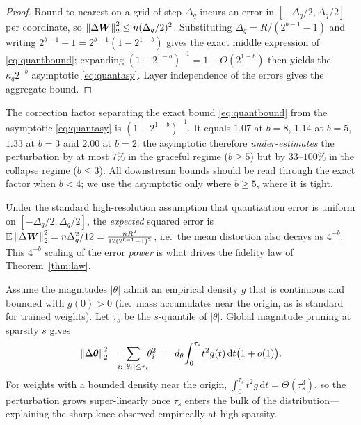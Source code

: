 \begin{proof}
Round-to-nearest on a grid of step $\Delta_q$ incurs an error in
$[-\Delta_q/2,\Delta_q/2]$ per coordinate, so $\left\lVert\Delta\bm{W}\right\rVert_2^2\le
n(\Delta_q/2)^2$. Substituting $\Delta_q=R/(2^{b-1}-1)$ and writing
$2^{b-1}-1=2^{b-1}(1-2^{1-b})$ gives the exact middle expression of
\eqref{eq:quantbound}; expanding $(1-2^{1-b})^{-1}=1+O(2^{1-b})$ then yields the
$\kappa_q 2^{-b}$ asymptotic \eqref{eq:quantasy}. Layer independence of the
errors gives the aggregate bound.
\end{proof}

\begin{remark}
\label{rem:asyacc}
The correction factor separating the exact bound \eqref{eq:quantbound} from the
asymptotic \eqref{eq:quantasy} is $(1-2^{1-b})^{-1}$. It equals $1.07$ at
$b=8$, $1.14$ at $b=5$, $1.33$ at $b=3$ and $2.00$ at $b=2$: the asymptotic
therefore \emph{under-estimates} the perturbation by at most $7\%$ in the
graceful regime ($b\ge5$) but by $33$--$100\%$ in the collapse regime
($b\le3$). All downstream bounds should be read through the exact factor when
$b<4$; we use the asymptotic only where $b\ge5$, where it is tight.
\end{remark}

\begin{remark}
Under the standard high-resolution assumption that quantization error is
uniform on $[-\Delta_q/2,\Delta_q/2]$, the \emph{expected} squared error is
$\mathbb{E}\left\lVert\Delta\bm{W}\right\rVert_2^2=n\Delta_q^2/12=\tfrac{n R^2}{12(2^{b-1}-1)^2}$, i.e.\ the
mean distortion also decays as $4^{-b}$. This $4^{-b}$ scaling of the error
\emph{power} is what drives the fidelity law of Theorem~\ref{thm:law}.
\end{remark}

\begin{lemma}
\label{lem:prune}
Assume the magnitudes $|\theta|$ admit an empirical density $g$ that is
continuous and bounded with $g(0)>0$ (i.e.\ mass accumulates near the origin, as
is standard for trained weights). Let $\tau_s$ be the $s$-quantile of $|\theta|$.
Global magnitude pruning at sparsity $s$ gives
\begin{equation}
\left\lVert\Delta\bm{\theta}\right\rVert_2^2=\!\!\sum_{i:\,|\theta_i|\le\tau_s}\!\!\theta_i^2
\;=\;d_\theta\!\int_{0}^{\tau_s}\! t^2 g(t)\,\mathrm dt\bigl(1+o(1)\bigr).
\label{eq:prunebound}
\end{equation}
For weights with a bounded density near the origin, $\int_0^{\tau_s}t^2g\,
\mathrm dt=\Theta(\tau_s^3)$, so the perturbation grows super-linearly once
$\tau_s$ enters the bulk of the distribution---explaining the sharp knee
observed empirically at high sparsity.
\end{lemma}

